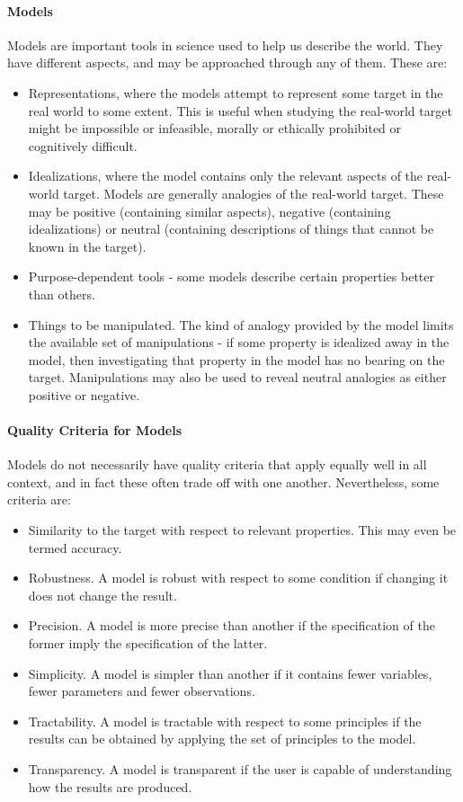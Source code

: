 \paragraph{Models}
Models are important tools in science used to help us describe the world. They have different aspects, and may be approached through any of them. These are:
\begin{itemize}
	\item Representations, where the models attempt to represent some target in the real world to some extent. This is useful when studying the real-world target might be impossible or infeasible, morally or ethically prohibited or cognitively difficult.
	\item Idealizations, where the model contains only the relevant aspects of the real-world target. Models are generally analogies of the real-world target. These may be positive (containing similar aspects), negative (containing idealizations) or neutral (containing descriptions of things that cannot be known in the target).
	\item Purpose-dependent tools - some models describe certain properties better than others.
	\item Things to be manipulated. The kind of analogy provided by the model limits the available set of manipulations - if some property is idealized away in the model, then investigating that property in the model has no bearing on the target. Manipulations may also be used to reveal neutral analogies as either positive or negative.
\end{itemize}

\paragraph{Quality Criteria for Models}
Models do not necessarily have quality criteria that apply equally well in all context, and in fact these often trade off with one another. Nevertheless, some criteria are:
\begin{itemize}
	\item Similarity to the target with respect to relevant properties. This may even be termed accuracy.
	\item Robustness. A model is robust with respect to some condition if changing it does not change the result.
	\item Precision. A model is more precise than another if the specification of the former imply the specification of the latter.
	\item Simplicity. A model is simpler than another if it contains fewer variables, fewer parameters and fewer observations.
	\item Tractability. A model is tractable with respect to some principles if the results can be obtained by applying the set of principles to the model.
	\item Transparency. A model is transparent if the user is capable of understanding how the results are produced.
\end{itemize}

